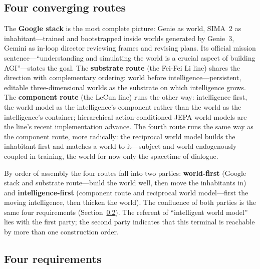 \documentclass[10pt]{article}
\begin{document}
\subsection{Four converging routes}\label{sec:routes}

The \textbf{Google stack} is the most complete picture: Genie as world\cite{deepmind2026genie4}, SIMA~2 as inhabitant---trained and bootstrapped inside worlds generated by Genie~3\cite{deepmind2025sima2}, Gemini as in-loop director reviewing frames and revising plans\cite{deepmind2026genie4}. Its official mission sentence---``understanding and simulating the world is a crucial aspect of building AGI''\cite{deepmind2026genie4}---states the goal. The \textbf{substrate route} (the Fei-Fei Li line) shares the direction with complementary ordering: world before intelligence---persistent, editable three-dimensional worlds as the substrate on which intelligence grows\cite{worldlabs2025marble,worldlabs2026atlas}. The \textbf{component route} (the LeCun line) runs the other way: intelligence first, the world model as the intelligence's component rather than the world as the intelligence's container\cite{lecun2022path}; hierarchical action-conditioned JEPA world models are the line's recent implementation advance\cite{zhang2026hjepa}. The fourth route runs the same way as the component route, more radically: the reciprocal world model builds the inhabitant first and matches a world to it---subject and world endogenously coupled in training, the world for now only the spacetime of dialogue\cite{duo2026}.

By order of assembly the four routes fall into two parties: \textbf{world-first} (Google stack and substrate route---build the world well, then move the inhabitants in) and \textbf{intelligence-first} (component route and reciprocal world model---first the moving intelligence, then thicken the world). The confluence of both parties is the same four requirements (Section~\ref{sec:four}). The referent of ``intelligent world model'' lies with the first party; the second party indicates that this terminal is reachable by more than one construction order.

\subsection{Four requirements}\label{sec:four}
\end{document}

